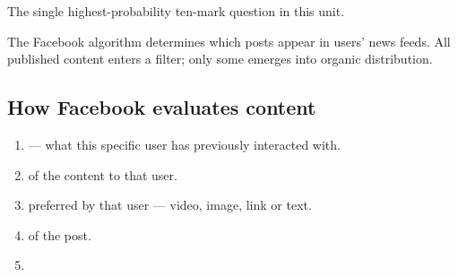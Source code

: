 \documentclass{MMTextbook}
\begin{document}
\begin{keybox}
The single highest-probability ten-mark question in this unit.
\end{keybox}

The Facebook algorithm determines which posts appear in users' news feeds. All
published content enters a filter; only some emerges into organic distribution.

\subsection{How Facebook evaluates content}

\begin{enumerate}
\item {} --- what this specific user has previously
      interacted with.
\item {} of the content to that user.
\item {} preferred by that user --- video, image, link or text.
\item {} of the post.
\item {}
\end{enumerate}
\end{document}
